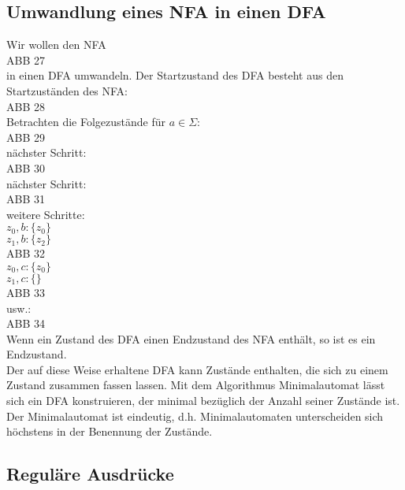 \subsection{Umwandlung eines NFA in einen DFA}\parskp
Wir wollen den NFA\\
ABB 27\\
in einen DFA umwandeln. Der Startzustand des DFA besteht aus den Startzuständen des NFA:\\
ABB 28\\
Betrachten die Folgezustände für $a \in \Sigma$:\\
ABB 29\\
nächster Schritt:\\
ABB 30\\
nächster Schritt:\\
ABB 31\\
weitere Schritte:\\
$z_0,b: \{z_0\}$\\
$z_1,b: \{z_2\}$\\
ABB 32\\
$z_0,c: \{z_0\}$\\
$z_1,c: \{\}$\\
ABB 33\\
usw.:\\
ABB 34\\
Wenn ein Zustand des DFA einen Endzustand des NFA enthält, so ist es ein Endzustand.\\
Der auf diese Weise erhaltene DFA kann Zustände enthalten, die sich zu einem Zustand zusammen fassen lassen. Mit dem Algorithmus Minimalautomat lässt sich ein DFA konstruieren, der minimal bezüglich der Anzahl seiner Zustände ist. Der Minimalautomat ist eindeutig, d.h. Minimalautomaten unterscheiden sich höchstens in der Benennung der Zustände.

\subsection{Reguläre Ausdrücke}
